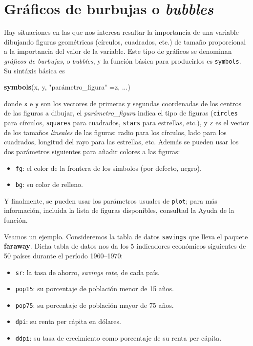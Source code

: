 \documentclass[
]{book}
\newenvironment{Shaded}{\begin{snugshade}}{\end{snugshade}}
\newcommand{\KeywordTok}[1]{\textcolor[rgb]{0.13,0.29,0.53}{\textbf{#1}}}
\newcommand{\NormalTok}[1]{#1}
\newcommand{\StringTok}[1]{\textcolor[rgb]{0.31,0.60,0.02}{#1}}
\providecommand{\tightlist}{%
  \setlength{\itemsep}{0pt}\setlength{\parskip}{0pt}}
\theoremstyle{definition}
\theoremstyle{definition}
\theoremstyle{definition}
\theoremstyle{remark}
\begin{document}
\hypertarget{gruxe1ficos-de-burbujas-o-bubbles}{%
\section{\texorpdfstring{Gráficos de burbujas o \emph{bubbles}}{Gráficos de burbujas o bubbles}}\label{gruxe1ficos-de-burbujas-o-bubbles}}

Hay situaciones en las que nos interesa resaltar la importancia de una variable dibujando figuras geométricas (círculos, cuadrados, etc.) de tamaño proporcional a la importancia del valor de la variable. Este tipo de gráficos se
denominan \emph{gráficos de burbujas}, o \emph{bubbles}, y la función básica para producirlos es \texttt{symbols}. Su sintáxis básica es

\begin{Shaded}
\begin{Highlighting}[]
\KeywordTok{symbols}\NormalTok{(x, y, }\StringTok{"parámetro\_figura"}\NormalTok{ =z, ...)}
\end{Highlighting}
\end{Shaded}

donde \texttt{x} e \texttt{y} son los vectores de primeras y segundas coordenadas de los centros de las figuras a dibujar, el
\emph{parámetro\_figura} indica el tipo de figuras (\texttt{circles} para círculos, \texttt{squares} para cuadrados, \texttt{stars} para estrellas, etc.), y \texttt{z} es el vector de los tamaños \emph{lineales} de las figuras: radio para los círculos, lado para los cuadrados, longitud del rayo para las estrellas, etc. Además se pueden usar los dos parámetros siguientes para añadir colores a las figuras:

\begin{itemize}
\tightlist
\item
  \texttt{fg}: el color de la frontera de los símbolos (por defecto, negro).
\item
  \texttt{bg}: su color de relleno.
\end{itemize}

Y finalmente, se pueden usar los parámetros usuales de \texttt{plot}; para más información, incluida la lista de figuras disponibles, consultad la Ayuda de la función.

Veamos un ejemplo. Consideremos la tabla de datos \texttt{savings} que lleva el paquete \textbf{faraway}. Dicha tabla de datos nos da los 5 indicadores económicos siguientes de 50 países durante el período 1960--1970:

\begin{itemize}
\tightlist
\item
  \texttt{sr}: la tasa de ahorro, \emph{savings rate}, de cada país.
\item
  \texttt{pop15}: su porcentaje de población menor de 15 años.
\item
  \texttt{pop75}: su porcentaje de población mayor de 75 años.
\item
  \texttt{dpi}: su renta per cápita en dólares.
\item
  \texttt{ddpi}: su tasa de crecimiento como porcentaje de su renta per cápita.
\end{itemize}
\end{document}
